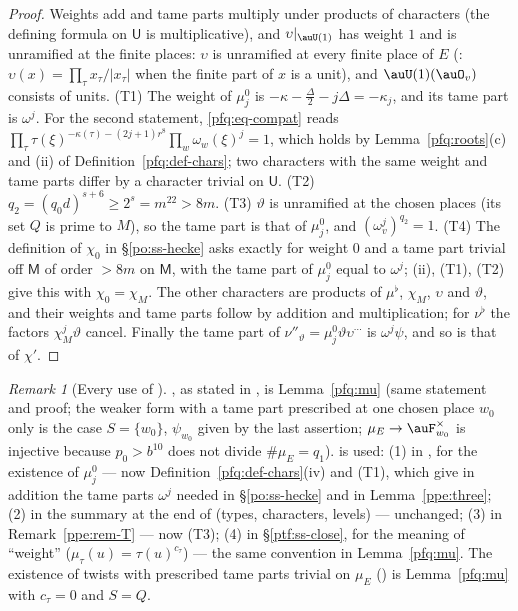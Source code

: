 \documentclass[10pt]{amsart}
\theoremstyle{definition}
\theoremstyle{remark}
\newtheorem{remark}[theorem]{Remark}
\begin{document}
\begin{proof}
Weights add and tame parts multiply under products of characters (the defining formula on $\mathsf U$ is multiplicative), and
$\upsilon|_{\auU(1)}$ has weight $1$ and is unramified at the finite places: $\upsilon$ is unramified at every
finite place of $E$ ({\cite[\S5.2.1]{P49}}: $\upsilon(x)=\prod_\tau x_\tau/|x_\tau|$ when the finite part of $x$ is a unit), and
$\auU(1)(\auO_v)$ consists of units.
(T1) The weight of $\mu^0_j$ is $-\kappa-\frac\Delta2-j\Delta=-\kappa_j$, and its tame part is $\omega^j$. For the second statement,
\eqref{pfq:eq-compat} reads $\prod_\tau\tau(\xi)^{-\kappa(\tau)-(2j+1)r^8}\prod_w\omega_w(\xi)^j=1$, which holds by Lemma~\ref{pfq:roots}(c)
and (ii) of Definition~\ref{pfq:def-chars}; two characters with the same weight and tame parts differ by a character trivial on
$\mathsf U$. (T2) $q_2=(q_0d)^{s+6}\ge2^s=m^{22}>8m$. (T3) $\vartheta$ is unramified at the chosen places (its set $Q$ is prime to
$M$), so the tame part is that of $\mu^0_j$, and $(\omega_v^j)^{q_2}=1$. (T4) The definition of $\chi_0$ in \S\ref{po:ss-hecke} asks
exactly for weight $0$ and a tame part trivial off $\mathsf M$ of order $>8m$ on $\mathsf M$, with the tame part of $\mu^0_j$ equal to
$\omega^j$; (ii), (T1), (T2) give this with $\chi_0=\chi_M$. The other characters are products of $\mu^\flat$, $\chi_M$, $\upsilon$ and
$\vartheta$, and their weights and tame parts follow by addition and multiplication; for $\nu^\flat$ the factors $\chi_M^j\vartheta$
cancel. Finally the tame part of $\nu''_\vartheta=\mu^0_j\vartheta\upsilon^{\cdots}$ is $\omega^j\psi$, and so is that of $\chi'$.
\end{proof}

\begin{remark}[Every use of {\cite[Lemma~8.6]{P49}}]\label{pfq:rem-pzmu}
{\cite[Lemma~8.6]{P49}}, as stated in {\cite[\S8]{P49}}, is Lemma~\ref{pfq:mu} (same statement and proof; the weaker form with a
tame part prescribed at one chosen place $w_0$ only is the case $S=\{w_0\}$, $\psi_{w_0}$ given by the last assertion; $\mu_E\to\auF_{w_0}^\times$ is injective because $p_0>b^{10}$ does not divide $\#\mu_E=q_1$). {\cite[Lemma~8.6]{P49}} is used: (1) in {\cite[\S14.3]{P46}}, for the
existence of $\mu^0_j$ --- now Definition~\ref{pfq:def-chars}(iv) and (T1), which give in addition the tame parts $\omega^j$ needed
in \S\ref{po:ss-hecke} and in Lemma~\ref{ppe:three}; (2) in the summary at the end of {\cite[\S8]{P49}} (types, characters, levels) ---
unchanged; (3) in Remark~\ref{ppe:rem-T} --- now (T3); (4) in \S\ref{ptf:ss-close}, for the meaning of ``weight''
($\mu_\tau(u)=\tau(u)^{c_\tau}$) --- the same convention in Lemma~\ref{pfq:mu}. The existence of twists with prescribed tame parts
trivial on $\mu_E$ ({\cite[\S14.3]{P46}}) is Lemma~\ref{pfq:mu} with $c_\tau=0$ and $S=Q$.
\end{remark}
\end{document}
